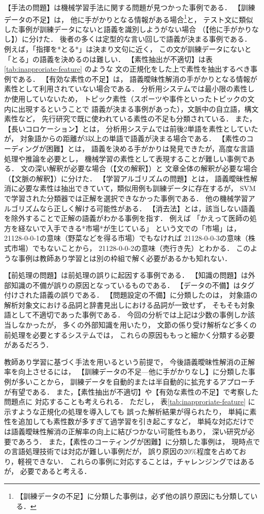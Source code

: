 \documentclass[japanese]{jnlp_1.4}
\begin{document}
【手法の問題】は機械学習手法に関する問題が見つかった事例である．
【訓練データの不足】は，
他に手がかりとなる情報がある場合\footnote{
  【訓練データの不足】に分類した事例は，必ず他の誤り原因にも分類している．
}と，
テスト文に類似した事例が訓練データにないと語義を識別しようがない場合
（【他に手がかりなし】）に分けた．
後者の多くは定型的な言い回しで語義が決まる事例である．
例えば，「指揮を*とる*」は決まり文句に近く，
この文が訓練データにないと「とる」の語義を決めるのは難しい．
【素性抽出が不適切】は表\ref{tab:inapproriate-feature} のような
文の正規化をした上で素性を抽出するべき事例である．
【有効な素性の不足】は，
語義曖昧性解消の手がかりとなる情報が素性として利用されていない場合である．
分析用システムでは最小限の素性しか使用していないため，
トピック素性（スポーツや事件といったトピックの文内に出現するということで
語義が決まる事例があった），文脈中の自立語，構文素性など，
先行研究で既に使われている素性の不足も分類されている．
また，【長いコロケーション】とは，
分析用システムでは前後2単語を素性としていたが，
対象語からの距離が3以上の単語で語義が決まる場合である．
【素性のコーディングが困難】とは，
語義を決める手がかりは発見できたが，高度な言語処理や推論を必要とし，
機械学習の素性として表現することが難しい事例である．
文の深い解釈が必要な場合（【文の解釈】）と
文章全体の解釈が必要な場合（【文脈の解釈】）に分けた．
【学習アルゴリズムの問題】とは，
語義曖昧性解消に必要な素性は抽出できていて，類似用例も訓練データに存在するが，
SVMで学習された分類器では正解を選択できなかった事例である．
他の機械学習アルゴリズムなら正しく解ける可能性がある．
【消去法】とは，該当しない語義を除外することで正解の語義がわかる事例を指す．
例えば
「かえって医師の処方を経ないで入手できる*市場*が生じている」
という文での「市場」は，
21128-0-0-1の意味（野菜などを得る市場）でもなければ
21128-0-0-3の意味（株式市場）でもないことから，
21128-0-0-2の意味（売行き先）とわかる．
このような事例は教師あり学習とは別の枠組で解く必要があるかも知れない．

【前処理の問題】は前処理の誤りに起因する事例である．
【知識の問題】は外部知識の不備が誤りの原因となっているものである．
【データの不備】はタグ付けされた語義の誤りである．
【問題設定の不備】に分類したのは，
対象語の解析対象文における品詞と辞書見出しにおける品詞が一致せず，
そもそも対象語として不適切であった事例である．
今回の分析では上記は少数の事例しか該当しなかったが，
多くの外部知識を用いたり，
文節の係り受け解析など多くの前処理を必要とするシステムでは，
これらの原因ももっと細かく分類する必要があるだろう．

教師あり学習に基づく手法を用いるという前提で，
今後語義曖昧性解消の正解率を向上させるには，
【訓練データの不足—他に手がかりなし】に分類した事例が多いことから，
訓練データを自動的または半自動的に拡充するアプローチが有望である．
また，【素性抽出が不適切】や【有効な素性の不足】で考察した問題点に
対応することも考えられる．
ただし，
表\ref{tab:inapproriate-feature} に示すような正規化の処理を導入しても
誤った解析結果が得られたり，
単純に素性を追加しても素性数が多すぎて過学習を引き起こすなど，
単純な対応だけでは語義曖昧性解消の正解率の向上に結びつかない可能性もあり，
深い研究が必要であろう．
また，【素性のコーティングが困難】に分類した事例は，
現時点での言語処理技術では対応が難しい事例だが，
誤り原因の20\%程度を占めており，軽視できない．
これらの事例に対応することは，チャレンジングではあるが，
必要であると考える．
\end{document}
